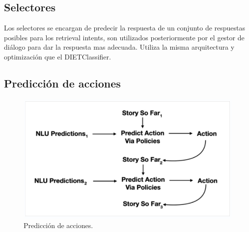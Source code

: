 \subsection{Selectores}
Los selectores se encargan de predecir la respuesta de un conjunto de respuestas posibles para los retrieval intents, son utilizados posteriormente por el gestor de diálogo para dar la respuesta mas adecuada.
Utiliza la misma arquitectura y optimización que el DIETClassifier.


\subsection{Predicción de acciones}
\begin{figure}[h!]
    \centering
    \includegraphics[width=\textwidth]{imagenes/cap3/predicciones.png}   
    \caption{Predicción de acciones.}
    \label{fig:regex-extractor}
\end{figure}

